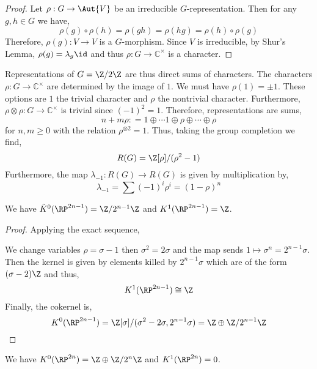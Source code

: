 \documentclass[12pt]{extarticle}
\newcommand{\C}{\mathbb{C}}
\begin{document}
\begin{proof}
Let $\rho : G \to \Aut{V}$ be an irreducible $G$-representation. Then for any $g, h \in G$ we have,
\[ \rho(g) \circ \rho(h) = \rho(gh) = \rho(hg) = \rho(h) \circ \rho(g) \]
Therefore, $\rho(g) : V \to V$ is a $G$-morphism. Since $V$ is irreducible, by Shur's Lemma, $\rho(g) = \lambda_g \id$ and thus $\rho : G \to \C^\times$ is a character.   
\end{proof}


\begin{example}
Representations of $G = \Z / 2 \Z$ are thus direct sums of characters. The characters $\rho : G \to \C^\times$ are determined by the image of $1$. We must have $\rho(1) = \pm 1$. These options are $1$ the trivial character and $\rho$ the nontrivial character. Furthermore, $\rho \otimes \rho : G \to \C^\times$ is trivial since $(-1)^2 = 1$. Therefore, representations are sums,
\[ n + m \rho : = 1 \oplus \cdots 1 \oplus \rho \oplus \cdots \oplus \rho \]
for $n, m \ge 0$ with the relation $\rho^{\otimes 2} = 1$. Thus, taking the group completion we find,
\[ R(G) = \Z[\rho]/(\rho^2 - 1) \]
Furthermore, the map $\lambda_{-1} : R(G) \to R(G)$ is given by multiplication by,
\[ \lambda_{-1} = \sum (-1)^i \rho^i = (1 - \rho)^n \]
\end{example}

\begin{prop}
We have $\tilde{K}^0(\RP^{2n - 1}) = \Z / 2^{n-1} \Z$ and $K^1(\RP^{2n-1}) = \Z$.
\end{prop}

\begin{proof}
Applying the exact sequence,
\begin{center}
\end{center}
We change variables $\rho = \sigma - 1$ then $\sigma^2 = 2 \sigma$ and the map sends $1 \mapsto \sigma^n = 2^{n-1} \sigma$. Then the kernel is given by elements killed by $2^{n-1} \sigma$ which are of the form $(\sigma - 2) \Z$ and thus,
\[ K^1(\RP^{2n - 1}) \cong \Z \]
Finally, the cokernel is,
\[ K^0(\RP^{2n - 1}) = \Z[\sigma]/(\sigma^2 - 2 \sigma, 2^{n-1} \sigma) = \Z \oplus \Z/2^{n-1} \Z \]
\end{proof}

\begin{prop}
We have $K^0(\RP^{2n}) = \Z \oplus \Z / 2^n \Z$ and $K^1(\RP^{2n}) = 0$.
\end{prop}
\end{document}
